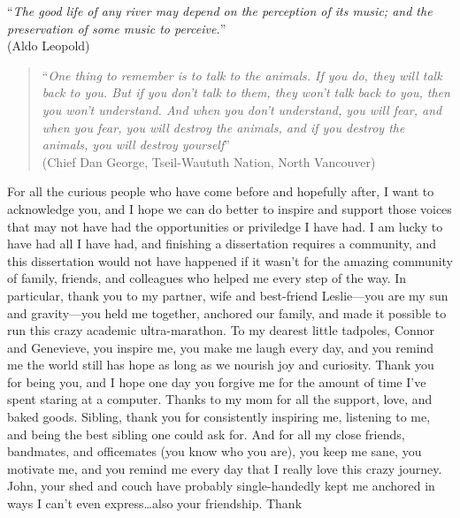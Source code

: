 \documentclass[proquest,12pt,final]{ucthesis-CA2012} %
\begin{document}
\begin{ucfrontmatter}
\begin{dedication}
\begin{center}
\begin{large}
        ``\emph{The good life of any river may depend on the perception of its
        music; and the preservation of some music to perceive.}''\\
        (Aldo Leopold)
        \begin{quote}
        ``\emph{One thing to remember is to talk to the animals. If you do, they
        will talk back to you. But if you don't talk to them, they won't talk
        back to you, then you won't understand. And when you don't understand,
        you will fear, and when you fear, you will destroy the animals, and if
        you destroy the animals, you will destroy yourself}''\\
        (Chief Dan George, Tseil-Waututh Nation, North Vancouver)
        \end{quote}
      \end{large}
      \end{center}
  \end{dedication}
  \begin{acknowledgements}
    For all the curious people who have come before and hopefully after, I
    want to acknowledge you, and I hope we can do better to inspire and
    support those voices that may not have had the opportunities or
    priviledge I have had. I am lucky to have had all I have had, and
    finishing a dissertation requires a community, and this dissertation
    would not have happened if it wasn't for the amazing community of
    family, friends, and colleagues who helped me every step of the way. In
    particular, thank you to my partner, wife and best-friend Leslie---you
    are my sun and gravity---you held me together, anchored our family, and
    made it possible to run this crazy academic ultra-marathon. To my
    dearest little tadpoles, Connor and Genevieve, you inspire me, you make
    me laugh every day, and you remind me the world still has hope as long
    as we nourish joy and curiosity. Thank you for being you, and I hope one
    day you forgive me for the amount of time I've spent staring at a
    computer. Thanks to my mom for all the support, love, and baked goods.
    Sibling, thank you for consistently inspiring me, listening to me, and
    being the best sibling one could ask for. And for all my close friends,
    bandmates, and officemates (you know who you are), you keep me sane, you
    motivate me, and you remind me every day that I really love this crazy
    journey. John, your shed and couch have probably single-handedly kept me
    anchored in ways I can't even express\ldots{}also your friendship. Thank

\end{acknowledgements}
\end{ucfrontmatter}
\end{document}
